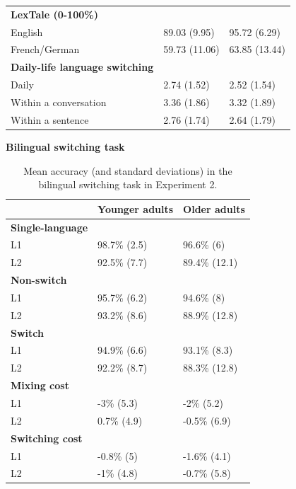 \documentclass[
]{article}
\begin{document}
\begin{table}[H]
\begin{tabular}[t]{lll}
\textbf{LexTale (0-100\%)} & \textbf{} & \textbf{}\\
English & 89.03 (9.95) & 95.72 (6.29)\\
\addlinespace
French/German & 59.73 (11.06) & 63.85 (13.44)\\
\textbf{Daily-life language switching} & \textbf{} & \textbf{}\\
Daily & 2.74 (1.52) & 2.52 (1.54)\\
Within a conversation & 3.36 (1.86) & 3.32 (1.89)\\
Within a sentence & 2.76 (1.74) & 2.64 (1.79)\\
\bottomrule
\end{tabular}
\end{table}

\newpage

\textbf{Bilingual switching task}

\begin{table}[H]

\caption{\label{tab:TableS7}Mean accuracy (and standard deviations) in the bilingual switching task in Experiment 2.}
\centering
\begin{tabular}[t]{lll}
\toprule
\textbf{} & \textbf{Younger adults} & \textbf{Older adults}\\
\midrule
\textbf{Single-language} & \textbf{} & \textbf{}\\
L1 & 98.7\% (2.5) & 96.6\% (6)\\
L2 & 92.5\% (7.7) & 89.4\% (12.1)\\
\textbf{Non-switch} & \textbf{} & \textbf{}\\
L1 & 95.7\% (6.2) & 94.6\% (8)\\
\addlinespace
L2 & 93.2\% (8.6) & 88.9\% (12.8)\\
\textbf{Switch} & \textbf{} & \textbf{}\\
L1 & 94.9\% (6.6) & 93.1\% (8.3)\\
L2 & 92.2\% (8.7) & 88.3\% (12.8)\\
\textbf{Mixing cost} & \textbf{} & \textbf{}\\
\addlinespace
L1 & -3\% (5.3) & -2\% (5.2)\\
L2 & 0.7\% (4.9) & -0.5\% (6.9)\\
\textbf{Switching cost} & \textbf{} & \textbf{}\\
L1 & -0.8\% (5) & -1.6\% (4.1)\\
L2 & -1\% (4.8) & -0.7\% (5.8)\\
\bottomrule
\end{tabular}
\end{table}
\end{document}
